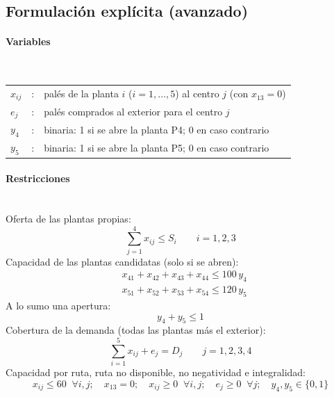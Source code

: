 \subsection{Formulación explícita (avanzado)}

\paragraph{Variables}\mbox{}\\
\begin{tabular}{l c l}
    $x_{ij}$ & : & palés de la planta $i$ ($i=1,\dots,5$) al centro $j$ (con $x_{13}=0$) \\
    $e_j$    & : & palés comprados al exterior para el centro $j$ \\
    $y_4$    & : & binaria: 1 si se abre la planta P4; 0 en caso contrario \\
    $y_5$    & : & binaria: 1 si se abre la planta P5; 0 en caso contrario \\
\end{tabular}

\paragraph{Restricciones}\mbox{}\\
Oferta de las plantas propias:
\begin{equation}
    \sum_{j=1}^{4} x_{ij} \leq S_i \qquad i=1,2,3
\end{equation}
Capacidad de las plantas candidatas (solo si se abren):
\begin{align}
    & x_{41} + x_{42} + x_{43} + x_{44} \leq 100\,y_4 \\
    & x_{51} + x_{52} + x_{53} + x_{54} \leq 120\,y_5
\end{align}
A lo sumo una apertura:
\begin{equation}
    y_4 + y_5 \leq 1
\end{equation}
Cobertura de la demanda (todas las plantas más el exterior):
\begin{equation}
    \sum_{i=1}^{5} x_{ij} + e_j = D_j \qquad j=1,2,3,4
\end{equation}
Capacidad por ruta, ruta no disponible, no negatividad e integralidad:
\begin{equation}
    x_{ij} \leq 60 \;\; \forall i,j; \quad x_{13}=0; \quad x_{ij} \geq 0 \;\; \forall i,j; \quad e_j \geq 0 \;\; \forall j; \quad y_4, y_5 \in \{0,1\}
\end{equation}

